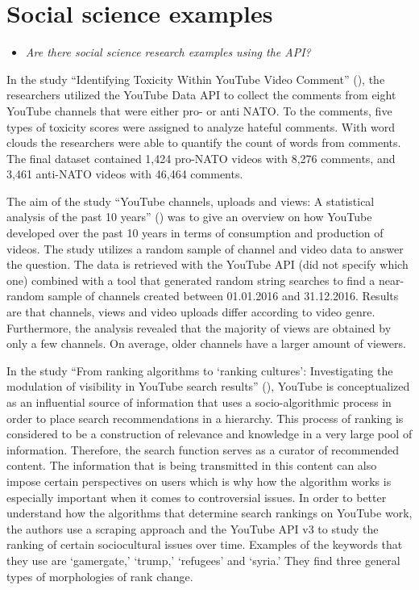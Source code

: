 \documentclass[
]{book}
\providecommand{\tightlist}{%
  \setlength{\itemsep}{0pt}\setlength{\parskip}{0pt}}
\begin{document}
\hypertarget{social-science-examples-7}{%
\section{Social science examples}\label{social-science-examples-7}}

\begin{itemize}
\tightlist
\item
  \emph{Are there social science research examples using the API?}
\end{itemize}

In the study ``Identifying Toxicity Within YouTube Video Comment'' (\citet{Obadimu2019}), the researchers utilized the YouTube Data API to collect the comments from eight YouTube channels that were either pro- or anti NATO. To the comments, five types of toxicity scores were assigned to analyze hateful comments. With word clouds the researchers were able to quantify the count of words from comments. The final dataset contained 1,424 pro-NATO videos with 8,276 comments, and 3,461 anti-NATO videos with 46,464 comments.

The aim of the study ``YouTube channels, uploads and views: A statistical analysis of the past 10 years'' (\citet{Baertl2018}) was to give an overview on how YouTube developed over the past 10 years in terms of consumption and production of videos. The study utilizes a random sample of channel and video data to answer the question. The data is retrieved with the YouTube API (did not specify which one) combined with a tool that generated random string searches to find a near-random sample of channels created between 01.01.2016 and 31.12.2016. Results are that channels, views and video uploads differ according to video genre. Furthermore, the analysis revealed that the majority of views are obtained by only a few channels. On average, older channels have a larger amount of viewers.

In the study ``From ranking algorithms to `ranking cultures': Investigating the modulation of visibility in YouTube search results'' (\citet{Rieder2018}), YouTube is conceptualized as an influential source of information that uses a socio-algorithmic process in order to place search recommendations in a hierarchy. This process of ranking is considered to be a construction of relevance and knowledge in a very large pool of information. Therefore, the search function serves as a curator of recommended content. The information that is being transmitted in this content can also impose certain perspectives on users which is why how the algorithm works is especially important when it comes to controversial issues. In order to better understand how the algorithms that determine search rankings on YouTube work, the authors use a scraping approach and the YouTube API v3 to study the ranking of certain sociocultural issues over time. Examples of the keywords that they use are `gamergate,' `trump,' `refugees' and `syria.' They find three general types of morphologies of rank change.
\end{document}
